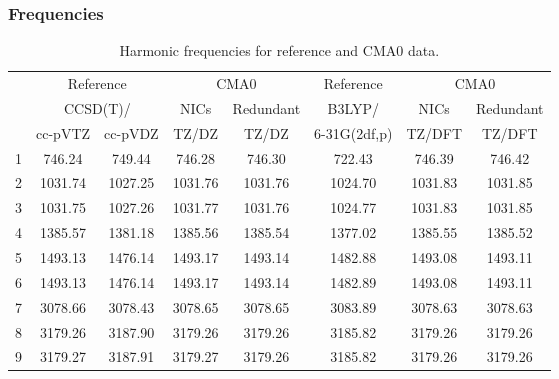 \documentclass[10pt,oneside]{article}
\begin{document}
\begin{table}[h!]
\subsubsection*{Frequencies}
\centering
\caption{Harmonic frequencies for reference and CMA0 data.}
\begin{tabular}{cccccccc}
\toprule
{} & \multicolumn{2}{c}{Reference} & \multicolumn{2}{c}{CMA0} &    Reference & \multicolumn{2}{c}{CMA0} \\
{} & \multicolumn{2}{c}{CCSD(T)/} &    NICs &  Redundant &       B3LYP/ &    NICs & Redundant \\
{} &   cc-pVTZ & cc-pVDZ &   TZ/DZ &      TZ/DZ & 6-31G(2df,p) &  TZ/DFT &    TZ/DFT \\
\midrule
1 &    746.24 &  749.44 &  746.28 &     746.30 &       722.43 &  746.39 &    746.42 \\
2 &   1031.74 & 1027.25 & 1031.76 &    1031.76 &      1024.70 & 1031.83 &   1031.85 \\
3 &   1031.75 & 1027.26 & 1031.77 &    1031.76 &      1024.77 & 1031.83 &   1031.85 \\
4 &   1385.57 & 1381.18 & 1385.56 &    1385.54 &      1377.02 & 1385.55 &   1385.52 \\
5 &   1493.13 & 1476.14 & 1493.17 &    1493.14 &      1482.88 & 1493.08 &   1493.11 \\
6 &   1493.13 & 1476.14 & 1493.17 &    1493.14 &      1482.89 & 1493.08 &   1493.11 \\
7 &   3078.66 & 3078.43 & 3078.65 &    3078.65 &      3083.89 & 3078.63 &   3078.63 \\
8 &   3179.26 & 3187.90 & 3179.26 &    3179.26 &      3185.82 & 3179.26 &   3179.26 \\
9 &   3179.27 & 3187.91 & 3179.27 &    3179.26 &      3185.82 & 3179.26 &   3179.26 \\
\bottomrule
\end{tabular}
\end{table}
\end{document}
